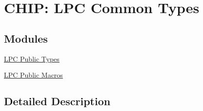 \hypertarget{group___l_p_c___types}{\section{C\+H\+I\+P\+: L\+P\+C Common Types}
\label{group___l_p_c___types}
}
\subsection*{Modules}
\begin{DoxyCompactItemize}
\item 
\hyperlink{group___l_p_c___types___public___types}{L\+P\+C Public Types}
\item 
\hyperlink{group___l_p_c___types___public___macros}{L\+P\+C Public Macros}
\end{DoxyCompactItemize}


\subsection{Detailed Description}
